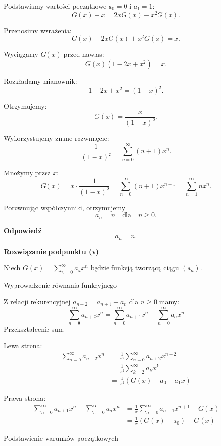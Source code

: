 \documentclass{mwart}
\begin{document}
\begin{mdframed}
    Podstawiamy wartości początkowe $a_0 = 0$ i $a_1 = 1$:
    \[
    G(x) - x = 2x G(x) - x^2 G(x).
    \]

    Przenosimy wyrażenia:
    \[
    G(x) - 2x G(x) + x^2 G(x) = x.
    \]

    Wyciągamy $G(x)$ przed nawias:
    \[
    G(x) (1 - 2x + x^2) = x.
    \]

    Rozkładamy mianownik:
    \[
    1 - 2x + x^2 = (1 - x)^2.
    \]

    Otrzymujemy:
    \[
    G(x) = \frac{x}{(1 - x)^2}.
    \]

    Wykorzystujemy znane rozwinięcie:
    \[
    \frac{1}{(1 - x)^2} = \sum_{n=0}^{\infty} (n+1) x^n.
    \]

    Mnożymy przez $x$:
    \[
    G(x) = x \cdot \frac{1}{(1 - x)^2} = \sum_{n=0}^{\infty} (n+1) x^{n+1} = \sum_{n=1}^{\infty} n x^n.
    \]

    Porównując współczynniki, otrzymujemy:
    \[
    a_n = n \quad \text{dla} \quad n \geq 0.
    \]

    \textbf{Odpowiedź}
    \[
    \boxed{a_n = n}.
    \]

    \textbf{Rozwiązanie podpunktu (v)}

    Niech $G(x) = \sum_{n=0}^{\infty} a_n x^n$ będzie funkcją tworzącą ciągu $(a_n)$.

    Wyprowadzenie równania funkcyjnego

    Z relacji rekurencyjnej $a_{n+2} = a_{n+1} - a_n$ dla $n \geq 0$ mamy:
    \[
    \sum_{n=0}^{\infty} a_{n+2} x^n = \sum_{n=0}^{\infty} a_{n+1} x^n - \sum_{n=0}^{\infty} a_n x^n
    \]
    Przekształcenie sum

    Lewa strona:
    \begin{align}
    \sum_{n=0}^{\infty} a_{n+2} x^n &= \frac{1}{x^2} \sum_{n=0}^{\infty} a_{n+2} x^{n+2} \\
    &= \frac{1}{x^2} \sum_{k=2}^{\infty} a_k x^k \\
    &= \frac{1}{x^2}(G(x) - a_0 - a_1 x)
    \end{align}

    Prawa strona:
    \begin{align}
    \sum_{n=0}^{\infty} a_{n+1} x^n - \sum_{n=0}^{\infty} a_n x^n &= \frac{1}{x}\sum_{n=0}^{\infty} a_{n+1} x^{n+1} - G(x) \\
    &= \frac{1}{x}(G(x) - a_0) - G(x)
    \end{align}

    Podstawienie warunków początkowych


\end{mdframed}
\end{document}
